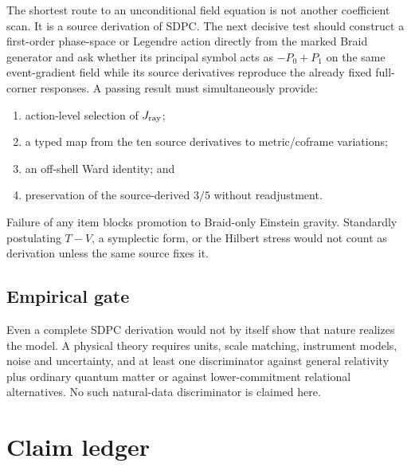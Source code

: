 \documentclass[11pt]{article}
\theoremstyle{definition}
\theoremstyle{remark}
\begin{document}
The shortest route to an unconditional field equation is not another coefficient scan. It is a source derivation of SDPC. The next decisive test should construct a first-order phase-space or Legendre action directly from the marked Braid generator and ask whether its principal symbol acts as $-P_0+P_1$ on the same event-gradient field while its source derivatives reproduce the already fixed full-corner responses. A passing result must simultaneously provide:
\begin{enumerate}
\item action-level selection of $J_{\rm ray}$;
\item a typed map from the ten source derivatives to metric/coframe variations;
\item an off-shell Ward identity; and
\item preservation of the source-derived $3/5$ without readjustment.
\end{enumerate}
Failure of any item blocks promotion to Braid-only Einstein gravity. Standardly postulating $T-V$, a symplectic form, or the Hilbert stress would not count as derivation unless the same source fixes it.

\subsection{Empirical gate}

Even a complete SDPC derivation would not by itself show that nature realizes the model. A physical theory requires units, scale matching, instrument models, noise and uncertainty, and at least one discriminator against general relativity plus ordinary quantum matter or against lower-commitment relational alternatives. No such natural-data discriminator is claimed here.

\section{Claim ledger}
\end{document}
